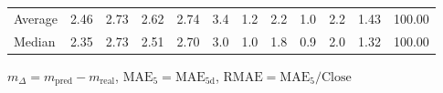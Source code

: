 \begin{threeparttable}
{\begin{tabular}{lrrrrrrrrrrr}
Average &          2.46 &          2.73 &          2.62 &        2.74 &                 3.4 &                 1.2 &        2.2 &                 1.0 &              2.2 &            1.43 &                 100.00 \\
 Median &          2.35 &          2.73 &          2.51 &        2.70 &                 3.0 &                 1.0 &        1.8 &                 0.9 &              2.0 &            1.32 &                 100.00 \\
\bottomrule
\end{tabular}
}
\begin{tablenotes}\footnotesize
\item $m_\Delta=m_{\text{pred}}-m_{\text{real}}$,
$\mathrm{MAE}_5=\mathrm{MAE}_{5\text{d}}$,
$\mathrm{RMAE}=\mathrm{MAE}_5/\text{Close}$
\end{tablenotes}
\end{threeparttable}
\endgroup

